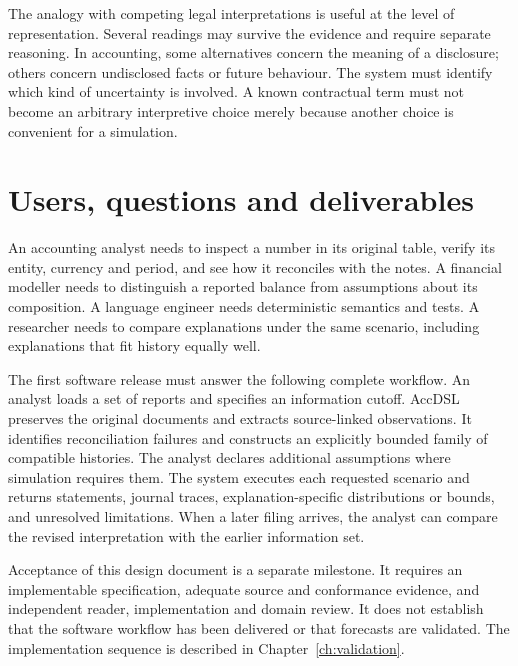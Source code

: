 The analogy with competing legal interpretations is useful at the level of
representation. Several readings may survive the evidence and require separate
reasoning. In accounting, some alternatives concern the meaning of a disclosure;
others concern undisclosed facts or future behaviour. The system must identify
which kind of uncertainty is involved. A known contractual term must not become
an arbitrary interpretive choice merely because another choice is convenient
for a simulation.

\section{Users, questions and deliverables}

An accounting analyst needs to inspect a number in its original table, verify
its entity, currency and period, and see how it reconciles with the notes. A
financial modeller needs to distinguish a reported balance from assumptions
about its composition. A language engineer needs deterministic semantics and
tests. A researcher needs to compare explanations under the same scenario,
including explanations that fit history equally well.

The first software release must answer the following complete workflow. An analyst
loads a set of reports and specifies an information cutoff. AccDSL preserves
the original documents and extracts source-linked observations. It identifies
reconciliation failures and constructs an explicitly bounded family of
compatible histories. The analyst declares additional assumptions where
simulation requires them. The system executes each requested scenario and
returns statements, journal traces, explanation-specific distributions or
bounds, and unresolved limitations. When a later filing arrives, the analyst
can compare the revised interpretation with the earlier information set.

Acceptance of this design document is a separate milestone. It requires an
implementable specification, adequate source and conformance evidence, and
independent reader, implementation and domain review. It does not establish
that the software workflow has been delivered or that forecasts are validated.
The implementation sequence is described in Chapter~\ref{ch:validation}.

